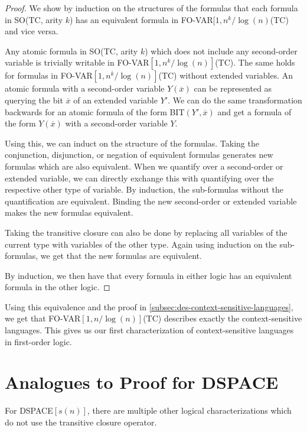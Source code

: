 \begin{proof}
    We show by induction on the structures of the formulas that each formula in SO(TC, arity $k$) has an equivalent formula in FO-VAR$[1, n^k/\log(n)$(TC) and vice versa.

    Any atomic formula in SO(TC, arity $k$) which does not include any second-order variable is trivially writable in FO-VAR$[1, n^k/\log(n)]$(TC).
    The same holds for formulas in FO-VAR$[1, n^k/\log(n)]$(TC) without extended variables.
    An atomic formula with a second-order variable $Y(\overline{x})$ can be represented as querying the bit $\overline{x}$ of an extended variable $Y'$.
    We can do the same transformation backwards for an atomic formula of the form BIT$(Y', \overline{x})$ and get a formula of the form $Y(\overline{x})$ with a second-order variable $Y$.

    Using this, we can induct on the structure of the formulas.
    Taking the conjunction, disjunction, or negation of equivalent formulas generates new formulas which are also equivalent.
    When we quantify over a second-order or extended variable, we can directly exchange this with quantifying over the respective other type of variable.
    By induction, the sub-formulas without the quantification are equivalent.
    Binding the new second-order or extended variable makes the new formulas equivalent.

    Taking the transitive closure can also be done by replacing all variables of the current type with variables of the other type.
    Again using induction on the sub-formulas, we get that the new formulas are equivalent.

    By induction, we then have that every formula in either logic has an equivalent formula in the other logic.
\end{proof}

Using this equivalence and the proof in \cref{subsec:des-context-sensitive-languages}, we get that FO-VAR$[1, n/\log(n)]$(TC) describes exactly the context-sensitive languages.
This gives us our first characterization of context-sensitive languages in first-order logic.


\section{Analogues to Proof for DSPACE}\label{sec:analogues-to-proof-for-dspace}

For DSPACE$[s(n)]$, there are multiple other logical characterizations which do not use the transitive closure operator.

